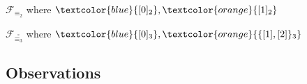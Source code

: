 \documentclass[10pt,serif, professionalfont]{beamer}
\begin{document}

\begin{frame}{$\mathcal{F}_{\equiv_{2}}$ where 
    $\textcolor{blue}{[0]_{2}},\textcolor{orange}{[1]_{2}}$}

    
\end{frame}

\begin{frame}{$\mathcal{F}_{\stackrel{\circ}{\equiv_{3}}}$ where 
    $\textcolor{blue}{[0]_{3}},\textcolor{orange}{\lbrace [1],[2] \rbrace_{3}}$}

    
\end{frame}



\subsection{Observations}
\end{document}
